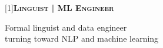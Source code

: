 \scalebox{1.3}[1]{\large\scshape \textsf{\bfseries Linguist \hspace{.05ex} | \hspace{.05ex} ML Engineer}}

\vspace{2ex}
Formal linguist and data engineer\\
turning toward NLP and machine learning

